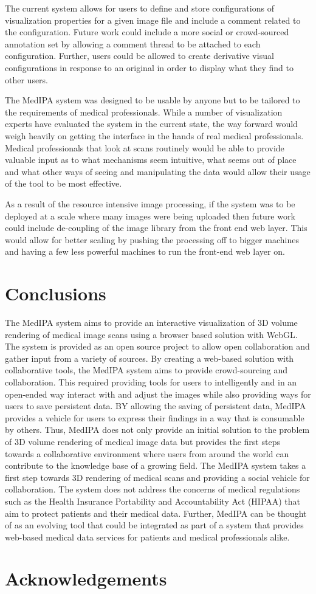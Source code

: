 \documentclass[annual]{acmsiggraph}
\begin{document}
The current system allows for users to define and store configurations of visualization properties for a given image file and include a comment related to the configuration.  Future work could include a more social or crowd-sourced annotation set by allowing a comment thread to be attached to each configuration.  Further, users could be allowed to create derivative visual configurations in response to an original in order to display what they find to other users.

The MedIPA system was designed to be usable by anyone but to be tailored to the requirements of medical professionals.  While a number of visualization experts have evaluated the system in the current state, the way forward would weigh heavily on getting the interface in the hands of real medical professionals.  Medical professionals that look at scans routinely would be able to provide valuable input as to what mechanisms seem intuitive, what seems out of place and what other ways of seeing and manipulating the data would allow their usage of the tool to be most effective.

As a result of the resource intensive image processing, if the system was to be deployed at a scale where many images were being uploaded then future work could include de-coupling of the image library from the front end web layer.  This would allow for better scaling by pushing the processing off to bigger machines and having a few less powerful machines to run the front-end web layer on.

\section{Conclusions}

	The MedIPA system aims to provide an interactive visualization of 3D volume rendering of medical image scans using a browser based solution with WebGL.  The system is provided as an open source project to allow open collaboration and gather input from a variety of sources.  By creating a web-based solution with collaborative tools, the MedIPA system aims to provide crowd-sourcing and collaboration.  This required providing tools for users to intelligently and in an open-ended way interact with and adjust the images while also providing ways for users to save persistent data.  BY allowing the saving of persistent data, MedIPA provides a vehicle for users to express their findings in a way that is consumable by others.  Thus, MedIPA does not only provide an initial solution to the problem of 3D volume rendering of medical image data but provides the first steps towards a collaborative environment where users from around the world can contribute to the knowledge base of a growing field.
	The MedIPA system takes a first step towards 3D rendering of medical scans and providing a social vehicle for collaboration.  The system does not address the concerns of medical regulations such as the Health Insurance Portability and Accountability Act (HIPAA) that aim to protect patients and their medical data.  Further, MedIPA can be thought of as an evolving tool that could be integrated as part of a system that provides web-based medical data services for patients and medical professionals alike. 

\section*{Acknowledgements}




\end{document}
